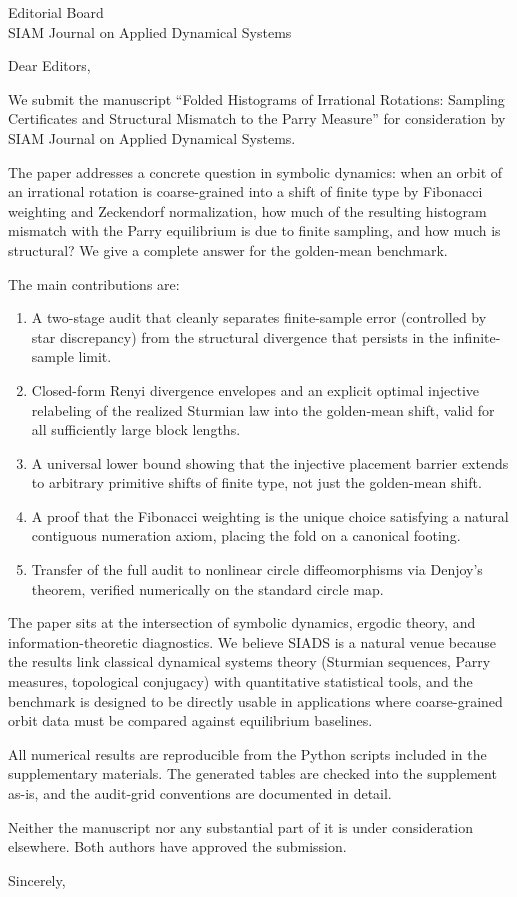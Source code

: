 \documentclass[11pt]{letter}
\begin{document}
\begin{letter}{Editorial Board \\ SIAM Journal on Applied Dynamical Systems}

\opening{Dear Editors,}

We submit the manuscript ``Folded Histograms of Irrational Rotations:
Sampling Certificates and Structural Mismatch to the Parry Measure''
for consideration by SIAM Journal on Applied Dynamical Systems.

The paper addresses a concrete question in symbolic dynamics: when an
orbit of an irrational rotation is coarse-grained into a shift of
finite type by Fibonacci weighting and Zeckendorf normalization, how
much of the resulting histogram mismatch with the Parry equilibrium
is due to finite sampling, and how much is structural? We give a
complete answer for the golden-mean benchmark.

The main contributions are:

\begin{enumerate}
\item A two-stage audit that cleanly separates finite-sample error
(controlled by star discrepancy) from the structural divergence
that persists in the infinite-sample limit.

\item Closed-form Renyi divergence envelopes and an explicit optimal
injective relabeling of the realized Sturmian law into the
golden-mean shift, valid for all sufficiently large block lengths.

\item A universal lower bound showing that the injective placement
barrier extends to arbitrary primitive shifts of finite type,
not just the golden-mean shift.

\item A proof that the Fibonacci weighting is the unique choice
satisfying a natural contiguous numeration axiom, placing the
fold on a canonical footing.

\item Transfer of the full audit to nonlinear circle diffeomorphisms
via Denjoy's theorem, verified numerically on the standard
circle map.
\end{enumerate}

The paper sits at the intersection of symbolic dynamics, ergodic
theory, and information-theoretic diagnostics. We believe SIADS is a
natural venue because the results link classical dynamical systems
theory (Sturmian sequences, Parry measures, topological conjugacy)
with quantitative statistical tools, and the benchmark is designed to
be directly usable in applications where coarse-grained orbit data
must be compared against equilibrium baselines.

All numerical results are reproducible from the Python scripts
included in the supplementary materials. The generated tables are
checked into the supplement as-is, and the audit-grid conventions
are documented in detail.

Neither the manuscript nor any substantial part of it is under
consideration elsewhere. Both authors have approved the submission.

\closing{Sincerely,}

\end{letter}
\end{document}
